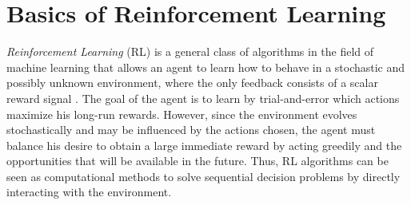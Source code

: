\section{Basics of Reinforcement Learning}
\label{sec:basics_reinforcement_learning}

\emph{Reinforcement Learning} (RL) is a general class of algorithms in the field of machine learning that allows an agent to learn how to behave in a stochastic and possibly unknown environment, where the only feedback consists of a scalar reward signal \cite{sutton1998introduction}. The goal of the agent is to learn by trial-and-error which actions maximize his long-run rewards. However, since the environment evolves stochastically and may be influenced by the actions chosen, the agent must balance his desire to obtain a large immediate reward by acting greedily and the opportunities that will be available in the future. Thus, RL algorithms can be seen as computational methods to solve sequential decision problems by directly interacting with the environment.\\

